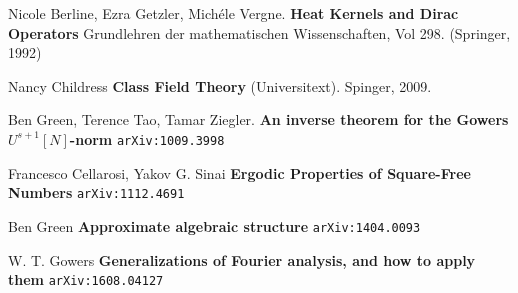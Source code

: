 \documentclass[12pt]{article}
\begin{document}
\begin{thebibliography}{}

\item Nicole Berline, Ezra Getzler, Mich\'{e}le Vergne. \textbf{Heat Kernels and Dirac Operators} Grundlehren der mathematischen Wissenschaften, Vol 298. (Springer, 1992)

\item Nancy Childress \textbf{Class Field Theory} (Universitext).  Spinger, 2009.

\item Ben Green, Terence Tao, Tamar Ziegler. \textbf{An inverse theorem for the Gowers $U^{s+1}[N]$-norm} \texttt{arXiv:1009.3998}

\item Francesco Cellarosi, Yakov G. Sinai \textbf{Ergodic Properties of Square-Free Numbers} \texttt{arXiv:1112.4691}

\item Ben Green \textbf{Approximate algebraic structure} \texttt{arXiv:1404.0093}

\item W. T. Gowers \textbf{Generalizations of Fourier analysis, and how to apply them} \texttt{arXiv:1608.04127}

\end{thebibliography}

\end{document}
